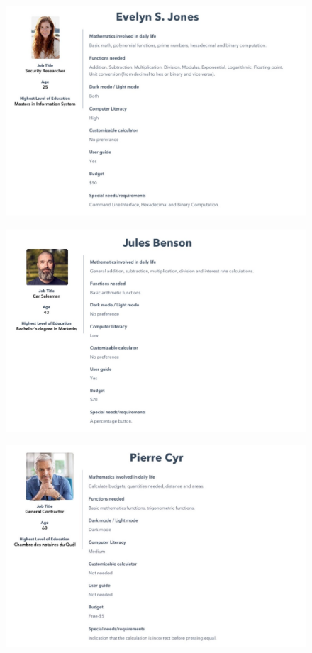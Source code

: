             \begin{figure}[!htb]
                \centering
                \includegraphics{images/Evelyn-S-Jones.JPG}
            \end{figure}
            \begin{figure}[!htb]
                \centering
                \includegraphics{images/Jules-Benson.JPG}
            \end{figure}
            \begin{figure}[!htb]
                \centering
                \includegraphics[scale=0.5]{images/Pierre-Cyr.JPG}
            \end{figure}
